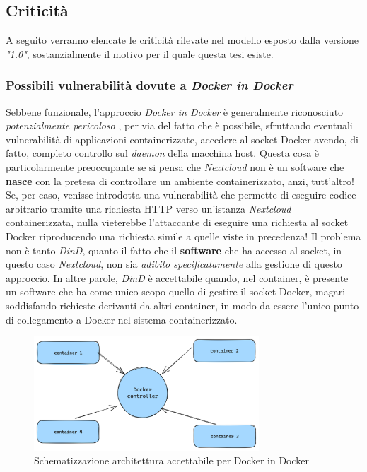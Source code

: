 \newpage

\subsection{Criticità}
A seguito verranno elencate le criticità rilevate nel modello esposto dalla versione \textit{"1.0"}, sostanzialmente il motivo per il quale questa tesi esiste.

\subsubsection{Possibili vulnerabilità dovute a \textit{Docker in Docker}} \label{dind-acceptable}
Sebbene funzionale, l'approccio \textit{Docker in Docker} è generalmente riconosciuto \textit{potenzialmente pericoloso} \cite{dind}, per via del fatto che è possibile, sfruttando eventuali vulnerabilità di applicazioni containerizzate, accedere al socket Docker avendo, di fatto, completo controllo sul \textit{daemon} della macchina host.
\newline
Questa cosa è particolarmente preoccupante se si pensa che \textit{Nextcloud} non è un software che \textbf{nasce} con la pretesa di controllare un ambiente containerizzato, anzi, tutt'altro! Se, per caso, venisse introdotta una vulnerabilità che permette di eseguire codice arbitrario tramite una richiesta HTTP verso un'istanza \textit{Nextcloud} containerizzata, nulla vieterebbe l'attaccante di eseguire una richiesta al socket Docker riproducendo una richiesta simile a quelle viste in precedenza!
\newline
Il problema non è tanto \textit{DinD}, quanto il fatto che il \textbf{software} che ha accesso al socket, in questo caso \textit{Nextcloud}, non sia \textit{adibito specificatamente} alla gestione di questo approccio. 
\newline
In altre parole, \textit{DinD} è accettabile quando, nel container, è presente un software che ha come unico scopo quello di gestire il socket Docker, magari soddisfando richieste derivanti da altri container, in modo da essere l'unico punto di collegamento a Docker nel sistema containerizzato.
\begin{figure}[h]
    \centering
    \includegraphics[width=0.75\textwidth]{files/images/dind-solution.png}
    \caption{Schematizzazione architettura accettabile per Docker in Docker}
    \label{fig:dind-acceptable}
\end{figure}
